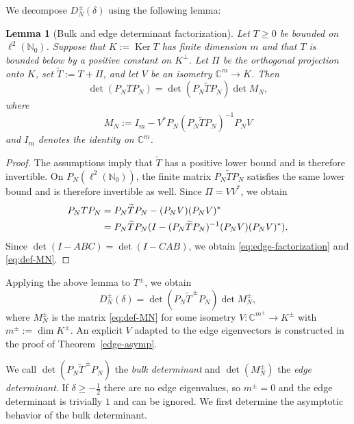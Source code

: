 \documentclass[11pt,a4paper,reqno]{amsart}
\newtheorem{lemma}[theorem]{Lemma}
\theoremstyle{remark}
\newcommand{\Nzero}{\mathbb N_0}
\newcommand{\C}{\mathbb C}
\newcommand{\Ker}{\operatorname{Ker}}
\newcommand{\id}{I}
\begin{document}
We decompose $D_N^\pm(\delta)$ using the following lemma:

\begin{lemma}[Bulk and edge determinant factorization]\label{lem:factorization}
Let $T\ge0$ be bounded on $\ell^2(\Nzero)$.  Suppose that
$K:=\Ker T$ has finite dimension $m$ and that $T$ is bounded below by a
positive constant on $K^\perp$.  Let $\Pi$ be the orthogonal projection onto
$K$, set $\widetilde T:=T+\Pi$, and let $V$ be an isometry $\C^m\to K$.  Then
\begin{equation}\label{eq:edge-factorization}
 \det(P_NTP_N)
 =\det(P_N\widetilde TP_N)\det M_N,
\end{equation}
where
\begin{equation}\label{eq:def-MN}
 M_N:=\id_m-V^*P_N(P_N\widetilde TP_N)^{-1}P_NV
\end{equation}
and $\id_m$ denotes the identity on $\mathbb C^m$.
\end{lemma}

\begin{proof}
The assumptions imply that $\widetilde T$ has a positive lower bound
and is therefore invertible. On $P_N(\ell^2(\Nzero))$, the
finite matrix $P_N\widetilde T P_N$ satisfies the same lower bound and is therefore invertible as well.
Since $\Pi=VV^*$, we obtain
\begin{align}
    P_NTP_N &= P_N\widetilde TP_N-(P_NV)(P_NV)^*\notag \\
    &= P_N\widetilde TP_N( \id - (P_N\widetilde TP_N)^{-1}(P_NV)(P_NV)^*).
\end{align}
Since $\det(\id - ABC) = \det(\id - CAB)$, we obtain \eqref{eq:edge-factorization} and \eqref{eq:def-MN}.
\end{proof}

Applying the above lemma to $T^\pm$, we obtain
\begin{equation}
    D_N^\pm(\delta) = \det(P_N\widetilde T^{\,\pm} P_N)\det M^\pm_N,
\end{equation}
where $M^\pm_N$ is the matrix \eqref{eq:def-MN} for some isometry
$V\colon\C^{m^\pm}\to K^\pm$ with $m^\pm:=\dim K^\pm$. An
explicit $V$ adapted to the edge eigenvectors is constructed in the proof of Theorem~\ref{edge-asymp}.

We call $\det(P_N\widetilde T^{\,\pm} P_N)$ the \emph{bulk determinant} and $\det( M^\pm_N)$ the \emph{edge determinant}. If $\delta \geq -\frac 12$ there are no edge eigenvalues, so $m^\pm=0$ and the edge determinant is trivially $1$ and can be ignored. We first determine the asymptotic behavior of the bulk determinant.
\end{document}
